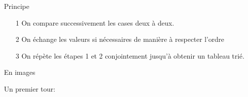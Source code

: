 \documentclass[12pt,a4paper]{beamer}
\begin{document}
\begin{frame}{Principe}
\begin{itemize}
\item[1]On compare successivement les cases deux à deux.
\item[2]On échange les valeurs si nécessaires de manière à respecter l'ordre
\item[3]On répète les étapes 1 et 2 conjointement jusqu'à obtenir un tableau trié.
\end{itemize}

\end{frame}



\begin{frame}{En images}

Un premier tour:






\end{frame}
\end{document}
